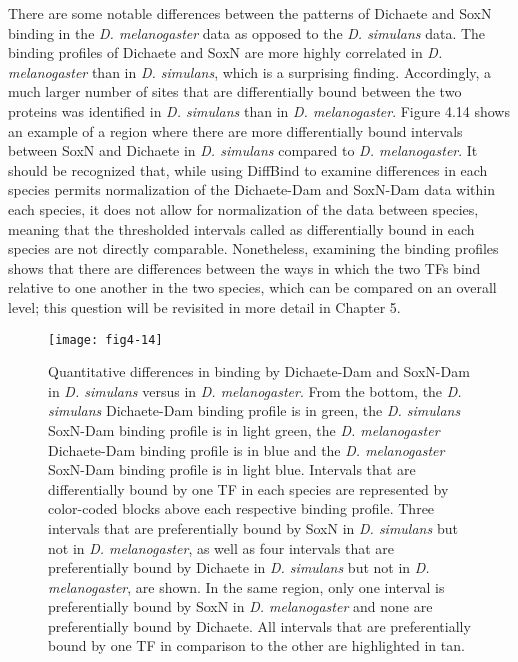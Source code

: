 There are some notable differences between the patterns of Dichaete and SoxN binding in the \emph{D. melanogaster} data as opposed to the \emph{D. simulans} data. The binding profiles of Dichaete and SoxN are more highly correlated in \emph{D. melanogaster} than in \emph{D. simulans}, which is a surprising finding. Accordingly, a much larger number of sites that are differentially bound between the two proteins was identified in \emph{D. simulans} than in \emph{D. melanogaster}. Figure 4.14 shows an example of a region where there are more differentially bound intervals between SoxN and Dichaete in \emph{D. simulans} compared to \emph{D. melanogaster}. It should be recognized that, while using DiffBind to examine differences in each species permits normalization of the Dichaete-Dam and SoxN-Dam data within each species, it does not allow for normalization of the data between species, meaning that the thresholded intervals called as differentially bound in each species are not directly comparable. Nonetheless, examining the binding profiles shows that there are differences between the ways in which the two TFs bind relative to one another in the two species, which can be compared on an overall level; this question will be revisited in more detail in Chapter 5.

\begin{figure}
\centering
\texttt{[image: fig4-14]}
\caption[Quantitative differences in binding by Dichaete-Dam and SoxN-Dam in \emph{D. simulans} versus in \emph{D. melanogaster}]{Quantitative differences in binding by Dichaete-Dam and SoxN-Dam in \emph{D. simulans} versus in \emph{D. melanogaster}. From the bottom, the \emph{D. simulans} Dichaete-Dam binding profile is in green, the \emph{D. simulans} SoxN-Dam binding profile is in light green, the \emph{D. melanogaster} Dichaete-Dam binding profile is in blue and the \emph{D. melanogaster} SoxN-Dam binding profile is in light blue. Intervals that are differentially bound by one TF in each species are represented by color-coded blocks above each respective binding profile. Three intervals that are preferentially bound by SoxN in \emph{D. simulans} but not in \emph{D. melanogaster}, as well as four intervals that are preferentially bound by Dichaete in \emph{D. simulans} but not in \emph{D. melanogaster}, are shown. In the same region, only one interval is preferentially bound by SoxN in \emph{D. melanogaster} and none are preferentially bound by Dichaete. All intervals that are preferentially bound by one TF in comparison to the other are highlighted in tan.}
\label{Figure 4.14}
\end{figure}

